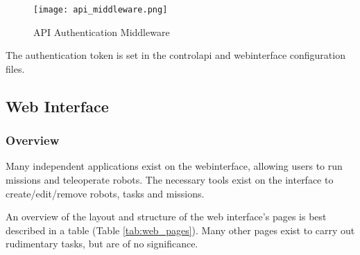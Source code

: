 \begin{figure}[!htb]
\begin{center}
\texttt{[image: api\_middleware.png]}
\end{center}
\caption{API Authentication Middleware}
\label{fig:api-auth-middleware}
\end{figure}

The authentication token is set in the \gls{controlapi} and \gls{webinterface} configuration files.

\subsection{Web Interface}

\subsubsection{Overview}
Many independent applications exist on the \gls{webinterface}, allowing users to run missions and teleoperate robots. The necessary tools exist on the interface to create/edit/remove robots, tasks and missions.

An overview of the layout and structure of the web interface's pages is best described in a table (Table \ref{tab:web_pages}). Many other pages exist to carry out rudimentary tasks, but are of no significance.

